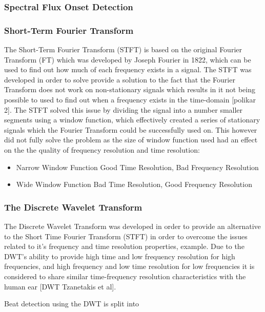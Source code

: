 \documentclass[a4paper, 11pt]{article}
\begin{document}
\subsubsection{Spectral Flux Onset Detection}


\subsubsection{Short-Term Fourier Transform}
The Short-Term Fourier Transform (STFT) is based on the original Fourier Transform (FT) which was developed by Joseph Fourier in 1822, which can be used to find out how much of each frequency exists in a signal. The STFT was developed in order to solve provide a solution to the fact that the Fourier Transform does not work on non-stationary signals which results in it not being possible to used to find out when a frequency exists in the time-domain [polikar 2]. The STFT solved this issue by dividing the signal into a number smaller segments using a window function, which effectively created a series of stationary signals which the Fourier Transform could be successfully used on. This however did not fully solve the problem as the size of window function used had an effect on the the quality of frequency resolution and time resolution:

\begin{itemize}
\item Narrow Window Function \longrightarrow  Good Time Resolution, Bad Frequency Resolution
\item Wide Window Function \longrightarrow  Bad Time Resolution, Good Frequency Resolution
\end{itemize}




\subsubsection{The Discrete Wavelet Transform}
The Discrete Wavelet Transform was developed in order to provide an alternative to the Short Time Fourier Transform (STFT) in order to overcome the issues related to it's frequency and time resolution properties, example. Due to the DWT's ability to provide high time and low frequency resolution for high frequencies, and high frequency and low time resolution for low frequencies it is considered to share similar time-frequency resolution characteristics with the human ear [DWT Tzanetakis et al].

Beat detection using the DWT is split into 
\maketitle{}
\end{document}
